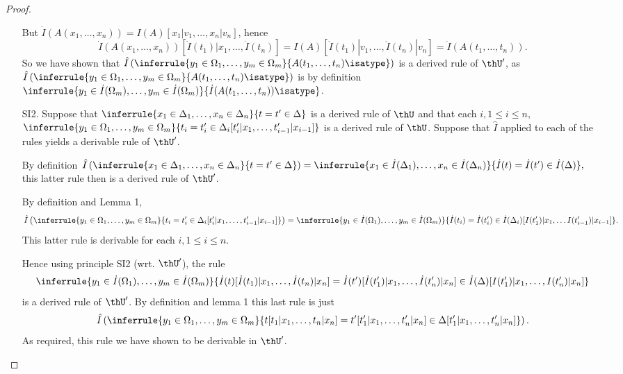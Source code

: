 \begin{proof}
\begin{enumerate}
        But $\dot I(A(x_1,\ldots,x_n))=I(A)[x_1|v_1,\ldots,x_n|v_n]$, hence
        \[\dot I(A(x_1,\ldots,x_n))[\dot I(t_1)|x_1,\ldots,\dot I(t_n)] = I(A)[\dot I(t_1)|v_1,\ldots,\dot I(t_n)|v_n] = \dot I(A(t_1,\ldots,t_n)).\]
        So we have shown that $\hat I\left(\inferrule{y_1\in\Omega_1,\ldots,y_m\in\Omega_m}{A(t_1,\ldots,t_n)\isatype}\right)$ is a derived rule of $\thU'$, as $\hat I\left(\inferrule{y_1\in\Omega_1,\ldots,y_m\in\Omega_m}{A(t_1,\ldots,t_n)\isatype}\right)$ is by definition $\inferrule{y_1\in\dot I(\Omega_m),\ldots,y_m\in\dot I(\Omega_m)}{\dot I(A(t_1,\ldots,t_n))\isatype}$.

      \item[SI2.] Suppose that $\inferrule{x_1\in\Delta_1,\ldots,x_n\in\Delta_n}{t=t'\in\Delta}$ is a derived rule of $\thU$ and that each $i,1\leq i\leq n,$ $\inferrule{y_1\in\Omega_1,\ldots,y_m\in\Omega_m}{t_i=t_i'\in\Delta_i[t_i'|x_1,\ldots,t_{i-1}'|x_{i-1}]}$ is a derived rule of $\thU$.
        Suppose that $\hat I$ applied to each of the rules yields a derivable rule of $\thU'$.

        By definition $\hat I\left(\inferrule{x_1\in\Delta_1,\ldots,x_n\in\Delta_n}{t=t'\in\Delta}\right) = \inferrule{x_1\in\dot I(\Delta_1),\ldots,x_n\in\dot I(\Delta_n)}{\dot I(t)=\dot I(t')\in\dot I(\Delta)},$ this latter rule then is a derived rule of $\thU'$.

        By definition and Lemma 1,
        \[\hat I\left (\inferrule{y_1\in\Omega_1,\ldots,y_m\in\Omega_m}{t_i=t_i'\in\Delta_i[t_i'|x_1,\ldots,t_{i-1}'|x_{i-1}]}\right)
        =\inferrule{y_1\in\dot I(\Omega_1),\ldots,y_m\in\dot I(\Omega_m)}{\dot I(t_i) = \dot I(t_i')\in\dot I(\Delta_i)[I(t_1')|x_1,\ldots I(t_{i-1}')|x_{i-1}]}.\]
        This latter rule is derivable for each $i,1\leq i\leq n$.

        Hence using principle SI2 (wrt. $\thU'$), the rule
        \[\inferrule{y_1\in\dot I(\Omega_1),\ldots,y_m\in\dot I(\Omega_m)}{\dot I(t)[\dot I(t_1)|x_1,\ldots,\dot I(t_n)|x_n] = \dot I(t')[\dot I(t_1')|x_1,\ldots,\dot I(t_n')|x_n]\in\dot I(\Delta)[I(t_1')|x_1,\ldots,I(t_n')|x_n]}\]
        is a derived rule of $\thU'$.
        By definition and lemma 1 this last rule is just
        \[\hat I\left(\inferrule{y_1\in\Omega_1,\ldots,y_m\in\Omega_m}{t[t_1|x_1,\ldots,t_n|x_n]=t'[t_1'|x_1,\ldots,t_n'|x_n]\in\Delta[t_1'|x_1,\ldots,t_n'|x_n]}\right).\]
        As required, this rule we have shown to be derivable in $\thU'$.
    \end{enumerate}
  \end{proof}

